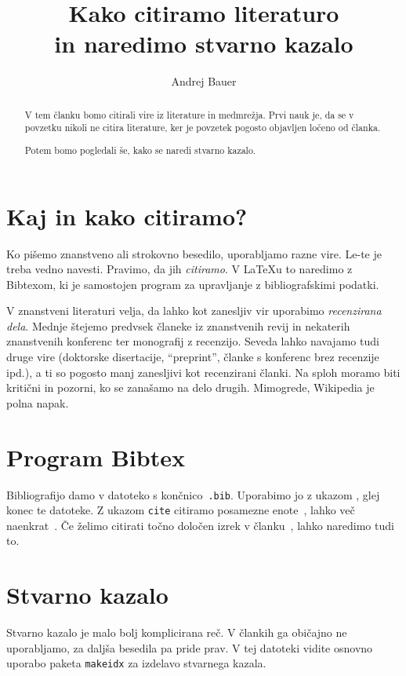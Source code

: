 \documentclass{article}
\begin{document}
\title{Kako citiramo literaturo\\ in naredimo stvarno kazalo}
\author{Andrej Bauer}
\maketitle

\begin{abstract}
  V tem članku bomo citirali vire iz literature in medmrežja.
  Prvi nauk je, da se v povzetku nikoli ne citira literature,
  ker je povzetek pogosto objavljen ločeno od članka.

  Potem bomo pogledali še, kako se naredi stvarno kazalo.
\end{abstract}


\section{Kaj in kako citiramo?}

Ko pišemo znanstveno ali strokovno besedilo, uporabljamo razne vire. Le-te je treba vedno
navesti. Pravimo, da jih \emph{citiramo}. V {\LaTeX}u to naredimo z Bibtexom, ki je
samostojen program za upravljanje z bibliografskimi podatki.

V znanstveni literaturi velja, da lahko kot zanesljiv vir uporabimo \emph{recenzirana
  dela}. Mednje štejemo predvsek članeke iz znanstvenih revij in nekaterih znanstvenih
konferenc ter monografij z recenzijo. Seveda lahko navajamo tudi druge vire (doktorske
disertacije, ``preprint'', članke s konferenc brez recenzije ipd.), a ti so pogosto manj
zanesljivi kot recenzirani članki.
%
Na sploh moramo biti kritični in pozorni, ko se
zanašamo na delo drugih. Mimogrede, Wikipedia je polna napak.

\section{Program Bibtex}

Bibliografijo damo v datoteko s končnico~\verb|.bib|. Uporabimo jo z ukazom
\verb||, glej konec te datoteke. Z ukazom \verb|cite| citiramo posamezne
enote~\cite{bauer06}, lahko več naenkrat~\cite{ersov80,lesnik10}. Če želimo citirati točno
določen izrek v članku~\cite[Izrek~2.1]{lawvere69}, lahko naredimo tudi to.
%

\section{Stvarno kazalo}

Stvarno kazalo%
%
je malo bolj komplicirana reč. V člankih ga običajno ne uporabljamo, za daljša besedila pa
pride prav. V tej datoteki vidite osnovno uporabo paketa \texttt{makeidx} za izdelavo
stvarnega kazala.
%
\end{document}
